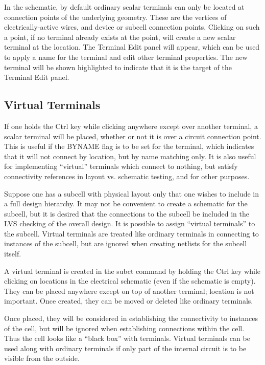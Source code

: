 In the schematic, by default ordinary scalar terminals can only be
located at connection points of the underlying geometry.  These are
the vertices of electrically-active wires, and device or subcell
connection points.  Clicking on such a point, if no terminal already
exists at the point, will create a new scalar terminal at the
location.  The {\cb Terminal Edit} panel will appear, which can be
used to apply a name for the terminal and edit other terminal
properties.  The new terminal will be shown highlighted to indicate
that it is the target of the {\cb Terminal Edit} panel.

\subsection{Virtual Terminals}

If one holds the {\kb Ctrl} key while clicking anywhere except over
another terminal, a scalar terminal will be placed, whether or not it
is over a circuit connection point.  This is useful if the {\et
BYNAME} flag is to be set for the terminal, which indicates that it
will not connect by location, but by name matching only.  It is also
useful for implementing ``virtual'' terminals which connect to
nothing, but satisfy connectivity references in layout vs.  schematic
testing, and for other purposes.

Suppose one has a subcell with physical layout only that one wishes to
include in a full design hierarchy.  It may not be convenient to
create a schematic for the subcell, but it is desired that the
connections to the subcell be included in the LVS checking of the
overall design.  It is possible to assign ``virtual terminals'' to the
subcell.  Virtual terminals are treated like ordinary terminals in
connecting to instances of the subcell, but are ignored when creating
netlists for the subcell itself.

A virtual terminal is created in the {\cb subct} command by holding
the {\kb Ctrl} key while clicking on locations in the electrical
schematic (even if the schematic is empty).  They can be placed
anywhere except on top of another terminal; location is not important. 
Once created, they can be moved or deleted like ordinary terminals.

Once placed, they will be considered in establishing the connectivity
to instances of the cell, but will be ignored when establishing
connections within the cell.  Thus the cell looks like a ``black box''
with terminals.  Virtual terminals can be used along with ordinary
terminals if only part of the internal circuit is to be visible from
the outside.

